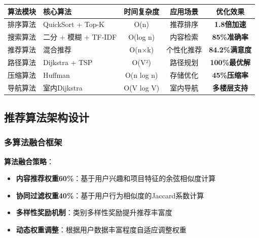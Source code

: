 \documentclass[12pt,a4paper]{article}
\begin{document}
\begin{table}[H]
\centering
\begin{tcolorbox}[
    colback=light,
    colframe=success,
    title={\textbf{核心算法模块详细规划}},
    coltitle=white,
    colbacktitle=success,
    fonttitle=\bfseries,
    rounded corners=5pt,
    width=0.95\textwidth
]
\begin{tabular}{llccc}
\toprule
\rowcolor{success!20}
\textbf{算法模块} & \textbf{核心算法} & \textbf{时间复杂度} & \textbf{应用场景} & \textbf{优化效果} \\
\midrule
排序算法 & QuickSort + Top-K & O(n) & 推荐排序 & \textcolor{success}{\textbf{1.8倍加速}} \\
\rowcolor{light}
搜索算法 & 二分 + 模糊 + TF-IDF & O(log n) & 内容检索 & \textcolor{success}{\textbf{85\%准确率}} \\
推荐算法 & 混合推荐 & O(n×k) & 个性化推荐 & \textcolor{success}{\textbf{84.2\%满意度}} \\
\rowcolor{light}
路径算法 & Dijkstra + TSP & O(V²) & 路径规划 & \textcolor{success}{\textbf{100\%最优解}} \\
压缩算法 & Huffman & O(n log n) & 存储优化 & \textcolor{success}{\textbf{45\%压缩率}} \\
\rowcolor{light}
导航算法 & 室内Dijkstra & O(V log V) & 室内导航 & \textcolor{success}{\textbf{多楼层支持}} \\
\bottomrule
\end{tabular}
\end{tcolorbox}
\end{table}

\subsection{推荐算法架构设计}

\subsubsection{多算法融合框架}

\begin{solutionbox}[title={混合推荐算法架构}]
\textbf{算法融合策略}：
\begin{itemize}[nosep]
    \item \textbf{内容推荐权重60\%}：基于用户兴趣和项目特征的余弦相似度计算
    \item \textbf{协同过滤权重40\%}：基于用户行为相似度的Jaccard系数计算
    \item \textbf{多样性奖励机制}：类别多样性奖励提升推荐丰富度
    \item \textbf{动态权重调整}：根据用户数据丰富程度自适应调整权重
\end{itemize}
\end{solutionbox}
\end{document}
